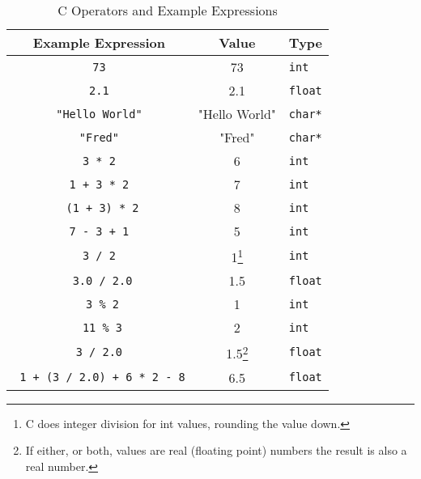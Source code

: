 \begin{table}[h]
  \begin{minipage}{\textwidth}
  \centering
  \begin{tabular}{|c|c|l|}
    \hline
    \textbf{Example Expression} & \textbf{Value} & \textbf{Type} \\
    \hline
    \texttt{ 73 }     &   73                 & \texttt{int}  \\
    \texttt{ 2.1 }      & 2.1   & \texttt{float}    \\
    \texttt{ "Hello World" }      &   "Hello World"    & \texttt{char*}   \\
    \texttt{ "Fred" }      &   "Fred"    & \texttt{char*}   \\
    \texttt{ 3 * 2 } & 6 & \texttt{int} \\
    \texttt{ 1 + 3 * 2 }  & 7 & \texttt{int} \\
    \texttt{ (1 + 3) * 2} & 8 & \texttt{int} \\
    \texttt{ 7 - 3 + 1 }  & 5 & \texttt{int} \\
    \texttt{ 3 / 2 } & 1\footnote{C does integer division for int values, rounding the value down.} & \texttt{int} \\
    \texttt{ 3.0 / 2.0} & 1.5 & \texttt{float} \\
    \texttt{ 3 \% 2} & 1 & \texttt{int} \\
    \texttt{ 11 \% 3} & 2 & \texttt{int} \\
    \texttt{ 3 / 2.0 } & 1.5\footnote{If either, or both, values are real (floating point) numbers the result is also a real number.} & \texttt{float} \\
    \texttt{ 1 + (3 / 2.0) + 6 * 2 - 8} & 6.5 & \texttt{float} \\
    \hline
  \end{tabular}
\end{minipage}
  \caption{C Operators and Example Expressions}
  \label{tbl:program-creation-c example expresions}
\end{table}




